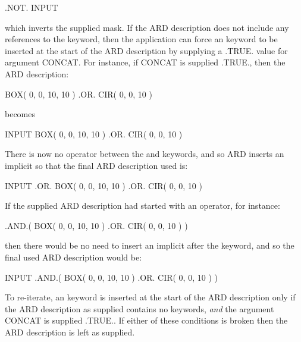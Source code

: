 \documentclass[11pt,nolof]{starlink}
\begin{document}
\small
\begin{terminalv}
      .NOT. INPUT
\end{terminalv}
\normalsize

which inverts the supplied mask. If the ARD description does not include any
references to the  keyword, then the application can force an  keyword
to be inserted at the start of the ARD description by supplying a .TRUE. value
for  argument CONCAT. For instance, if CONCAT is supplied .TRUE., then
the ARD description:

\small
\begin{terminalv}
      BOX( 0, 0, 10, 10 ) .OR. CIR( 0, 0, 10 )
\end{terminalv}
\normalsize

becomes

\small
\begin{terminalv}
      INPUT BOX( 0, 0, 10, 10 ) .OR. CIR( 0, 0, 10 )
\end{terminalv}
\normalsize

There is now no operator between the  and  keywords, and so ARD inserts
an implicit  so that the final ARD description used is:

\small
\begin{terminalv}
      INPUT .OR. BOX( 0, 0, 10, 10 ) .OR. CIR( 0, 0, 10 )
\end{terminalv}
\normalsize

If the supplied ARD description had started with an operator, for instance:

\small
\begin{terminalv}
      .AND.( BOX( 0, 0, 10, 10 ) .OR. CIR( 0, 0, 10 ) )
\end{terminalv}
\normalsize

then there would be no need to insert an implicit  after the  keyword,
and so the final used ARD description would be:

\small
\begin{terminalv}
      INPUT .AND.( BOX( 0, 0, 10, 10 ) .OR. CIR( 0, 0, 10 ) )
\end{terminalv}
\normalsize

To re-iterate, an  keyword is inserted at the start of the ARD description
only if the ARD description as supplied contains no  keywords, \emph{and}
the  argument CONCAT is supplied .TRUE.. If either of these conditions
is broken then the ARD description is left as supplied.
\end{document}
